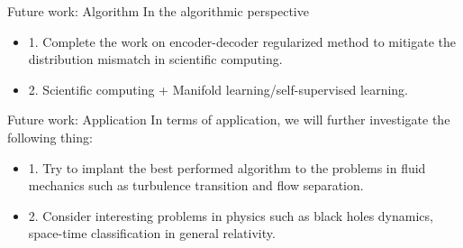 \documentclass{beamer}
\begin{document}
\begin{frame}{Future work: Algorithm}
In the algorithmic perspective
	\begin{itemize}
		\item 1. Complete the work on encoder-decoder regularized method to mitigate the distribution mismatch in scientific computing.
		\item 2. Scientific computing + Manifold learning/self-supervised learning.
	\end{itemize}

\end{frame}


\begin{frame}{Future work: Application}
	In terms of application, we will further investigate the following thing:
	\begin{itemize}
		\item 1. Try to implant the best performed algorithm to the problems in fluid mechanics such as turbulence transition and flow separation.
		\item 2. Consider interesting problems in physics such as black holes dynamics, space-time classification in general relativity.
	\end{itemize}

\end{frame}
\end{document}
